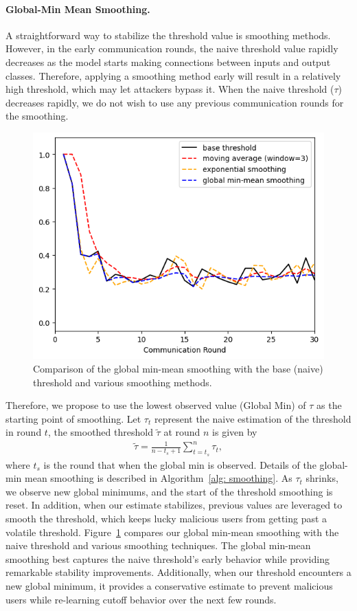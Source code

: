 \documentclass{article} %
\begin{document}
\paragraph{Global-Min Mean Smoothing.} 
A straightforward way to stabilize the threshold value is smoothing methods. However, in the early communication rounds, the naive threshold value rapidly decreases as the model starts making connections between inputs and output classes. Therefore, applying a smoothing method early will result in a relatively high threshold, which may let attackers bypass it. When the naive threshold ($\tau$) decreases rapidly, we do not wish to use any previous communication rounds for the smoothing. 

\pagedepth\maxdimen
\begin{figure}
    \includegraphics[width=.4\textwidth]{pics/smoothing--d_rounds30.png}
    \caption{\footnotesize Comparison of the global min-mean smoothing with the base (naive) threshold and various smoothing methods. 
    }
    \label{fig: smoothing}
\end{figure}

Therefore, we propose to use the lowest observed value (Global Min) of $\tau$ as the starting point of smoothing. Let $\tau_t$ represent the naive estimation of the threshold in round $t$, the smoothed threshold $\tilde{\tau}$ at round $n$ is given by
\begin{align*}
    \tilde{\tau} = \frac{1}{n-t_s+1}\sum_{t=t_s}^n \tau_t,
\end{align*}
where $t_s$ is the round that when the global min is observed. Details of the global-min mean smoothing is described in Algorithm~\ref{alg: smoothing}. As $\tau_t$ shrinks, we observe new global minimums, and the start of the threshold smoothing is reset.  In addition, when our estimate stabilizes, previous values are leveraged to smooth the threshold, which keeps lucky malicious users from getting past a volatile threshold. Figure~\ref{fig: smoothing} compares our global min-mean smoothing with the naive threshold and various smoothing techniques. The global min-mean smoothing best captures the naive threshold's early behavior while providing remarkable stability improvements. Additionally, when our threshold encounters a new global minimum, it provides a conservative estimate to prevent malicious users while re-learning cutoff behavior over the next few rounds.
\end{document}
